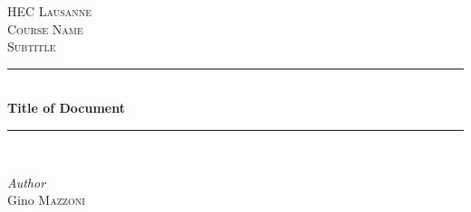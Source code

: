 \documentclass[main.tex]{subfiles}
\begin{document}
{\selectfont}
\begin{titlepage} %
	\newcommand{\HRule}{\rule{\linewidth}{0.5mm}} %
	
	\center %
	
	
	\textsc{\LARGE HEC Lausanne}\\[1.5cm] %
	
	\textsc{\Large Course Name}\\[0.5cm] %
	
	\textsc{\large  Subtitle}\\[0.5cm] %
	
	
	\HRule\\[0.4cm]
	
	{\huge\bfseries Title of Document}\\[0.4cm] %
	
	\HRule\\[1.5cm]
	
	
	\begin{minipage}{0.4\textwidth}
		\begin{center}
			\large
			\textit{Author}\\
            Gino \textsc{Mazzoni} \\
		\end{center}
	\end{minipage}
	~
	

\end{titlepage}
\end{document}
